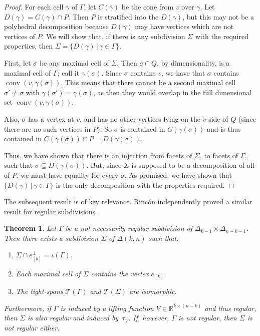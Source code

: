 \documentclass[11pt,a4paper]{amsart}
\newcommand{\RR}{{\mathbb{R}}}
\newcommand{\smallSetOf}[2]{\{#1\,|\,#2\}}
\DeclareMathOperator{\conv}{conv}
\newcommand{\Atightspan}[1]{{\mathcal{T}(#1)}}
\theoremstyle{plain}
\newtheorem{theorem}{Theorem}
\theoremstyle{definition}
\begin{document}
\begin{proof}
  For each cell $\gamma$ of $\Gamma$, let $C(\gamma)$ be the cone from $v$ over $\gamma$. Let
  $D(\gamma) = C(\gamma) \cap P$. Then $P$ is stratified into the $D(\gamma)$, but this may not be a
  polyhedral decomposition because $D(\gamma)$ may have vertices which are not vertices of $P$.  We
  will show that, if there is any subdivision $\Sigma$ with the required properties, then
  $\Sigma=\smallSetOf{D(\gamma)}{\gamma\in\Gamma}$.

  First, let $\sigma$ be any maximal cell of $\Sigma$. Then $\sigma \cap Q$, by dimensionality, is a
  maximal cell of $\Gamma$; call it $\gamma(\sigma)$. Since $\sigma$ contains $v$, we have that
  $\sigma$ contains $\conv (v,\gamma(\sigma))$.  This means that there cannot be a second maximal
  cell $\sigma'\ne\sigma$ with $\gamma(\sigma')=\gamma(\sigma)$, as then they would overlap in the
  full dimensional set $\conv(v, \gamma(\sigma))$.

  Also, $\sigma$ has a vertex at $v$, and has no other vertices lying on the $v$-side of $Q$ (since there
  are no such vertices in $P$).  So $\sigma$ is contained in $C(\gamma(\sigma))$ and is thus contained in
  $C(\gamma(\sigma)) \cap P = D(\gamma(\sigma))$.

  Thus, we have shown that there is an injection from facets of $\Sigma$, to facets of $\Gamma$,
  such that $\sigma \subseteq D(\gamma(\sigma))$. But, since $\Sigma$ is supposed to be a
  decomposition of all of $P$, we must have equality for every $\sigma$. As promised, we have shown
  that $\smallSetOf{D(\gamma)}{\gamma\in\Gamma}$ is the only decomposition with the properties
  required.
\end{proof}

The subsequent result is of key relevance.  Rinc\'on independently proved a similar result for
regular subdivisions~\cite{Rincon}.

\begin{theorem}\label{thm:tight-span}
  Let $\Gamma$ be a not necessarily regular subdivision of $\Delta_{k-1}\times\Delta_{n-k-1}$.  Then
  there exists a subdivision $\Sigma$ of $\Delta(k,n)$ such that:
  \begin{enumerate}
  \item $\Sigma\cap e_{[k]}^\perp=\iota(\Gamma)$.\label{it:tight-span:equal}
  \item Each maximal cell of $\Sigma$ contains the vertex $e_{[k]}$. \label{it:tight-span:max-cell}
  \item The tight-spans $\Atightspan{\Gamma}$ and $\Atightspan{\Sigma}$ are isomorphic. \label{it:tight-span:iso}
  \end{enumerate}
  Furthermore, if $\Gamma$ is induced by a lifting function $V\in\RR^{k\times(n-k)}$ and thus
  regular, then $\Sigma$ is also regular and induced by~$\tau_V$.  If, however, $\Gamma$ is not
  regular, then $\Sigma$ is not regular either.
\end{theorem}
\end{document}
